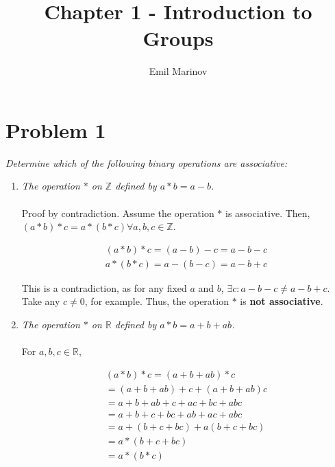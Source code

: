 \documentclass[12pt,letterpaper]{article}
\begin{document}
\title{Chapter 1 - Introduction to Groups}
\author{Emil Marinov}
\maketitle

\section{Problem 1}
\textit{Determine which of the following binary operations are associative:}

\begin{enumerate}
   \item \textit{The operation $*$ on $\mathbb{Z}$ defined by $a * b = a - b$.} \\
   \\

   Proof by contradiction.
   Assume the operation $*$ is associative.
   Then, $(a * b) * c = a * (b * c) \forall a, b, c \in \mathbb{Z}$.

   \begin{equation}
      \begin{aligned}
         (a * b) * c = (a - b) - c = a - b - c \\
         a * (b * c) = a - (b - c) = a - b + c
      \end{aligned}
   \end{equation}

   This is a contradiction, as for any fixed $a$ and $b$, $\exists c : a - b - c \neq a - b + c$.
   Take any $c \neq 0$, for example.
   Thus, the operation $*$ is \textbf{not associative}.

   \item \textit{The operation $*$ on $\mathbb{R}$ defined by $a * b = a + b + ab$.} \\
   \\
   For $a, b, c \in \mathbb{R}$,

   \begin{equation}
      \begin{aligned}
         (a * b) * c = (a + b + ab) * c \\
         = (a + b + ab) + c + (a + b + ab)c \\
         = a + b + ab + c + ac + bc + abc \\
         = a + b + c + bc + ab + ac + abc \\
         = a + (b + c + bc) + a(b + c + bc) \\
         = a * (b + c + bc) \\
         = a * (b * c)
      \end{aligned}
   \end{equation}


\end{enumerate}
\end{document}
